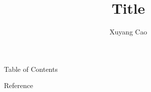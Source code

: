 \documentclass[t,10pt]{beamer} %
\title{Title}
\author{Xuyang Cao}
\date{}
\begin{document}
\frame{\titlepage}                  


\begin{frame}{Table of Contents}           %
    \setcounter{tocdepth}{1}               %
    \tableofcontents                       %
\end{frame}

 

\begin{frame}{Reference}
    \vspace{-0.5em}
    
    \tiny
\end{frame}
\end{document}
